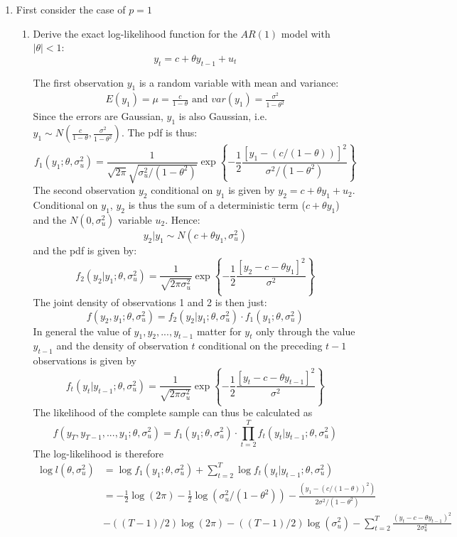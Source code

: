 \documentclass[a4paper]{scrartcl}
\begin{document}
\begin{enumerate}
	\item First consider the case of $p=1$
	\begin{enumerate}
		\item Derive the exact log-likelihood function for the $AR(1)$ model with $|\theta|<1$:
		$$y_t = c + \theta y_{t-1} + u_t$$
		\begin{solution}
		The first observation $y_1$ is a random variable with mean and variance:
		\begin{align*}
		E(y_1) = \mu = \frac{c}{1-\theta} \text{ and } var(y_1) = \frac{\sigma^2}{1-\theta^2}
		\end{align*}
		Since the errors are Gaussian, $y_1$ is also Gaussian, i.e. $y_1 \sim N\left(\frac{c}{1-\theta},\frac{\sigma^2}{1-\theta^2}\right)$. The pdf is thus:
		$$f_1(y_1;\theta,\sigma_u^2) = \frac{1}{\sqrt{2\pi}\sqrt{\sigma_u^2/(1-\theta^2)}}\exp\left\{-\frac{1}{2}\frac{[y_1-(c/(1-\theta))]^2}{\sigma^2/(1-\theta^2)}\right\}$$
		The second observation $y_2$ conditional on $y_1$ is given by $y_2 = c + \theta y_1 + u_2$. Conditional on $y_1$, $y_2$ is thus the sum of a deterministic term ($c+\theta y_1$) and the $N(0,\sigma_u^2)$ variable $u_2$. Hence:
		$$ y_2|y_1 \sim N(c+\theta y_1,\sigma_u^2)$$ and the pdf is given by:
		$$f_2(y_2|y_1;\theta,\sigma_u^2) = \frac{1}{\sqrt{2\pi\sigma_u^2}}\exp\left\{-\frac{1}{2}\frac{[y_2-c-\theta y_1]^2}{\sigma^2}\right\}$$
		The joint density of observations 1 and 2 is then just:
		$$f(y_2,y_1;\theta,\sigma_u^2) = f_2(y_2|y_1;\theta,\sigma_u^2)\cdot f_1(y_1;\theta,\sigma_u^2)$$
		In general the value of $y_1,y_2,...,y_{t-1}$ matter for $y_t$ only through the value $y_{t-1}$ and the density of observation $t$ conditional on the preceding $t-1$ observations is given by
		$$f_t(y_t|y_{t-1};\theta,\sigma_u^2) = \frac{1}{\sqrt{2\pi\sigma_u^2}}\exp\left\{-\frac{1}{2}\frac{[y_t-c-\theta y_{t-1}]^2}{\sigma^2}\right\}$$
		The likelihood of the complete sample can thus be calculated as
		$$f(y_T,y_{T-1},...,y_1;\theta,\sigma_u^2)=f_1(y_1;\theta,\sigma_u^2)\cdot \prod_{t=2}^{T}f_t(y_t|y_{t-1};\theta,\sigma_u^2)$$ The log-likelihood is therefore
		\begin{align*}
		\log l(\theta,\sigma_u^2)&= \log f_1(y_1;\theta,\sigma_u^2)+  \sum_{t=2}^{T}\log f_t(y_t|y_{t-1};\theta,\sigma_u^2)\\
		&= -\frac{1}{2}\log(2\pi) -\frac{1}{2}\log(\sigma_u^2/(1-\theta^2))-\frac{(y_1-(c/(1-\theta))^2)}{2\sigma^2/(1-\theta^2)}\\
		&-((T-1)/2)\log(2\pi)-((T-1)/2)\log(\sigma^2_u)-\sum_{t=2}^{T}\frac{(y_t-c-\theta y_{t-1})^2}{2\sigma_u^2}
		\end{align*}
		\end{solution}
	

\end{enumerate}
\end{enumerate}
\end{document}
